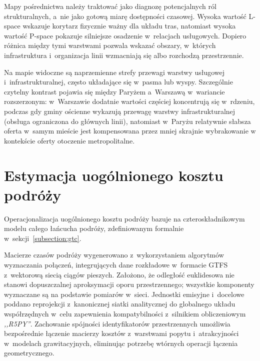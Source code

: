 \documentclass{pracamgr}
\begin{document}
Mapy pośrednictwa należy traktować jako diagnozę potencjalnych ról strukturalnych, a~nie jako gotową miarę dostępności czasowej. Wysoka wartość \mbox{L-space} wskazuje korytarz fizycznie ważny dla układu tras, natomiast wysoka wartość \mbox{P-space} pokazuje silniejsze osadzenie w~relacjach usługowych. Dopiero różnica między tymi warstwami pozwala wskazać obszary, w~których infrastruktura i~organizacja linii wzmacniają się albo rozchodzą przestrzennie.

Na mapie widoczne są naprzemienne strefy przewagi warstwy usługowej i~infrastrukturalnej, często układające się w~pasma lub wyspy. Szczególnie czytelny kontrast pojawia się między Paryżem a~Warszawą w~wariancie rozszerzonym: w~Warszawie dodatnie wartości częściej koncentrują się w~rdzeniu, podczas gdy gminy ościenne wykazują przewagę warstwy infrastrukturalnej (obsługa ograniczona do głównych linii), natomiast w~Paryżu relatywnie słabsza oferta w~samym mieście jest kompensowana przez mniej skrajnie wybrakowanie w kontekście oferty otoczenie metropolitalne.

\section{Estymacja uogólnionego kosztu podróży}\label{section:wyniki_wtc}

Operacjonalizacja uogólnionego kosztu podróży bazuje na czteroskładnikowym modelu całego łańcucha podróży, zdefiniowanym formalnie w~sekcji~\ref{subsection:gtc}. 

Macierze czasów podróży wygenerowano z~wykorzystaniem algorytmów wyznaczania połączeń, integrujących dane rozkładowe w~formacie GTFS z~wektorową siecią ciągów pieszych. Założono, że odległość euklidesowa nie stanowi dopuszczalnej aproksymacji oporu przestrzennego; wszystkie komponenty wyznaczane są na podstawie pomiarów w~sieci. Jednostki emisyjne i~docelowe poddano reprojekcji z~kanonicznej siatki analitycznej do globalnego układu współrzędnych w~celu zapewnienia kompatybilności z~silnikiem obliczeniowym \textit{,,R5PY''}. Zachowanie spójności identyfikatorów przestrzennych umożliwia bezpośrednie łączenie macierzy kosztów z~warstwami popytu i~atrakcyjności w~modelach grawitacyjnych, eliminując potrzebę wtórnych operacji łączenia geometrycznego.
\end{document}
